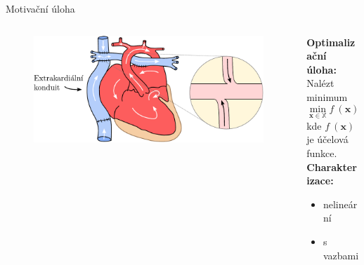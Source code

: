 \documentclass[aspectratio=169,xcolor=dvipsnames]{beamer}
\newcommand{\vect}[1]{\mathbf{#1}}
\begin{document}
\begin{frame}{Motivační úloha}
	\begin{columns}[T] %
		\begin{column}{.63\textwidth}
			\begin{figure}
				\includegraphics[width=0.9\linewidth]{Images/srdce_zoom_cz.pdf}
			\end{figure}
		\end{column}%
		\hfill%
		\begin{column}{.37\textwidth}
			\vspace{0pt}
			\textbf{Optimalizační úloha:}\\
			\vspace{6pt}
			Nalézt minimum
			\begin{equation*}
				\min _{\vect{x} \in \mathbb{X} } f \ (\vect{x}),
			\end{equation*}
			kde $ f \ (\vect{x}) $ je účelová funkce.\\ \pause
			\vspace{11pt}
			\textbf{Charakterizace:}\\[2pt]
			\begin{itemize}
				\item nelineární
				\item s vazbami
			\end{itemize}
		\end{column}%
	\end{columns}
\end{frame}

\end{document}
